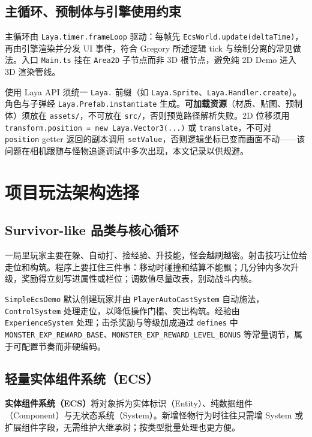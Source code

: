 \documentclass[UTF8,a4paper]{ctexart}
\begin{document}
\subsection{主循环、预制体与引擎使用约束}

主循环由 \texttt{Laya.timer.frameLoop} 驱动：每帧先 \texttt{EcsWorld.update(deltaTime)}，再由引擎渲染并分发 UI 事件，符合 Gregory 所述逻辑 tick 与绘制分离的常见做法\cite{gregory2018game,unitymanual2016}。入口 \texttt{Main.ts} 挂在 \texttt{Area2D} 子节点而非 3D 根节点，避免纯 2D Demo 进入 3D 渲染管线。

使用 Laya API 须统一 \texttt{Laya.} 前缀（如 \texttt{Laya.Sprite}、\texttt{Laya.Handler.create}）。角色与子弹经 \texttt{Laya.Prefab.instantiate} 生成。\textbf{可加载资源}（材质、贴图、预制体）须放在 \texttt{assets/}，不可放在 \texttt{src/}，否则预览路径解析失败。2D 位移须用 \texttt{transform.position = new Laya.Vector3(...)} 或 \texttt{translate}，不可对 \texttt{position} getter 返回的副本调用 \texttt{setValue}，否则逻辑坐标已变而画面不动——该问题在相机跟随与怪物追逐调试中多次出现，本文记录以供规避。

\section{项目玩法架构选择}
\label{sec:gameplay-arch}

\subsection{Survivor-like 品类与核心循环}

一局里玩家主要在躲、自动打、捡经验、升技能，怪会越刷越密。射击技巧让位给走位和构筑\cite{gregory2018game}。程序上要扛住三件事：移动时碰撞和结算不能飘；几分钟内多次升级，奖励得立刻写进属性或栏位；调数值尽量改表，别动战斗内核。

\texttt{SimpleEcsDemo} 默认创建玩家并由 \texttt{PlayerAutoCastSystem} 自动施法，\texttt{ControlSystem} 处理走位，以降低操作门槛、突出构筑。经验由 \texttt{ExperienceSystem} 处理；击杀奖励与等级加成通过 \texttt{defines} 中 \texttt{MONSTER\_EXP\_REWARD\_BASE}、\texttt{MONSTER\_EXP\_REWARD\_LEVEL\_BONUS} 等常量调节，属于可配置节奏而非硬编码。

\subsection{轻量实体组件系统（ECS）}

\textbf{实体组件系统（ECS）}将对象拆为实体标识（Entity）、纯数据组件（Component）与无状态系统（System）。新增怪物行为时往往只需增 System 或扩展组件字段，无需维护大继承树；按类型批量处理也更方便\cite{gregory2018game}。
\end{document}
